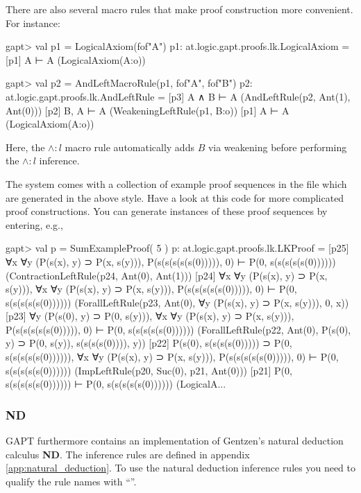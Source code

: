 \documentclass[a4paper,11pt]{article}
\renewcommand{\land}{\wedge}
\newcommand{\ND}{\textbf{ND}}
\newcommand{\cli}[1]{{\ttfamily {#1}}}
\begin{document}
There are also several macro rules that make proof construction more convenient.
For instance:
\begin{clilisting}
gapt> val p1 = LogicalAxiom(fof"A")
p1: at.logic.gapt.proofs.lk.LogicalAxiom =
[p1] A ⊢ A    (LogicalAxiom(A:o))

gapt> val p2 = AndLeftMacroRule(p1, fof"A", fof"B")
p2: at.logic.gapt.proofs.lk.AndLeftRule =
[p3] A ∧ B ⊢ A    (AndLeftRule(p2, Ant(1), Ant(0)))
[p2] B, A ⊢ A    (WeakeningLeftRule(p1, B:o))
[p1] A ⊢ A    (LogicalAxiom(A:o))

\end{clilisting}
Here, the $\land:l$ macro rule automatically adds $B$ via weakening before
performing the $\land:l$ inference.

The system comes with a collection of example proof sequences in the file
\cli{examples/ProofSequences.scala} which are generated in the above style.
Have a look at this code for more complicated proof constructions.
You can generate instances of these proof sequences by entering, e.g.,
\begin{clilisting}
gapt> val p = SumExampleProof( 5 )
p: at.logic.gapt.proofs.lk.LKProof =
[p25] ∀x ∀y (P(s(x), y) ⊃ P(x, s(y))), P(s(s(s(s(s(0))))), 0) ⊢ P(0, s(s(s(s(s(0))))))    (ContractionLeftRule(p24, Ant(0), Ant(1)))
[p24] ∀x ∀y (P(s(x), y) ⊃ P(x, s(y))),
∀x ∀y (P(s(x), y) ⊃ P(x, s(y))),
P(s(s(s(s(s(0))))), 0)
⊢
P(0, s(s(s(s(s(0))))))    (ForallLeftRule(p23, Ant(0), ∀y (P(s(x), y) ⊃ P(x, s(y))), 0, x))
[p23] ∀y (P(s(0), y) ⊃ P(0, s(y))),
∀x ∀y (P(s(x), y) ⊃ P(x, s(y))),
P(s(s(s(s(s(0))))), 0)
⊢
P(0, s(s(s(s(s(0))))))    (ForallLeftRule(p22, Ant(0), P(s(0), y) ⊃ P(0, s(y)), s(s(s(s(0)))), y))
[p22] P(s(0), s(s(s(s(0))))) ⊃ P(0, s(s(s(s(s(0)))))),
∀x ∀y (P(s(x), y) ⊃ P(x, s(y))),
P(s(s(s(s(s(0))))), 0)
⊢
P(0, s(s(s(s(s(0))))))    (ImpLeftRule(p20, Suc(0), p21, Ant(0)))
[p21] P(0, s(s(s(s(s(0)))))) ⊢ P(0, s(s(s(s(s(0))))))    (LogicalA...

\end{clilisting}

\subsubsection{ND}

GAPT furthermore contains an implementation of Gentzen's natural deduction
calculus \ND .
The inference rules are defined in appendix \ref{app:natural_deduction}. To use
the natural deduction inference rules you need to qualify the rule names with
``\cli{nd.}''.
\end{document}
